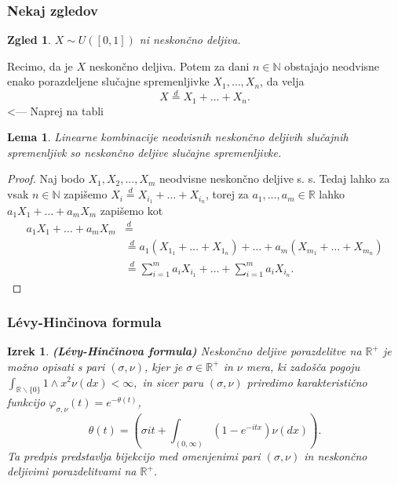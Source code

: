 \documentclass[]{beamer} %
\theoremstyle{plain}
\newtheorem{izrek}{Izrek}
\newtheorem{zgled}{Zgled}
\newtheorem{lema}{Lema}
\begin{document}
\begin{frame}
  \frametitle{Nekaj zgledov}
  \begin{zgled}
    $ X\sim \textit{U}([0, 1])$ ni neskončno deljiva.
  \end{zgled}
  \pause
  Recimo, da je $X$ neskončno deljiva. Potem za dani $n \in \mathbb{N}$ obstajajo
  neodvisne enako porazdeljene slučajne spremenljivke $X_1, \dots, X_n$, da velja
  $$
  X \stackrel{d}{=} X_1 + \dots + X_n.
  $$
  \pause
  <--- Naprej na tabli



\end{frame}


\begin{frame}
  \begin{lema}
    Linearne kombinacije neodvisnih neskončno deljivih slučajnih spremenljivk so neskončno deljive slučajne spremenljivke.
\end{lema}

\pause
\begin{proof}
    Naj bodo $X_1, X_2, ..., X_m$ neodvisne neskončno deljive s. s. Tedaj lahko za vsak $n \in \mathbb{N}$ 
    zapišemo $X_i \stackrel{d}{=} X_{i_1} + \dots + X_{i_n}$, torej za
    $a_1, \dots, a_m \in \mathbb{R}$ lahko $a_1X_1 + \dots + a_mX_m$ zapišemo kot 
    \begin{align*}
        a_1X_1 + \dots + a_mX_m &\stackrel{d}{=} \\
                                &\stackrel{d}{=} a_1(X_{1_1} + \dots + X_{1_n}) + \dots + a_m(X_{m_1} + \dots + X_{m_n}) \\
                                &\stackrel{d}{=} \sum_{i=1}^ma_iX_{i_1} + \dots + \sum_{i=1}^ma_iX_{i_n}.
    \end{align*}
\end{proof}
\end{frame}


\begin{frame}
  \frametitle{Lévy-Hinčinova formula}
  \begin{izrek}
    \textbf{(Lévy-Hinčinova formula)} 
    Neskončno deljive porazdelitve na $\mathbb{R}^+$ je možno opisati s pari $(\sigma, \nu)$, kjer je 
    $\sigma \in \mathbb{R}^+$ in $\nu$ mera, ki zadošča pogoju $\int_{\mathbb{R}\backslash\{0\}}1 \wedge x^2 \nu(dx)< \infty,$
    in sicer paru $(\sigma, \nu)$ priredimo karakteristično funkcijo $\varphi_{\sigma, \nu}(t) = e^{-\theta(t)}$,
    $$
    \theta(t) = \left(\sigma i t + \int_{(0, \infty)}(1 - e^{-i t x}) \nu(dx)\right).
    $$
    Ta predpis predstavlja bijekcijo med omenjenimi pari  $(\sigma, \nu)$ in neskončno deljivimi porazdelitvami na $\mathbb{R}^+$.
  \end{izrek}
\end{frame}
\end{document}
